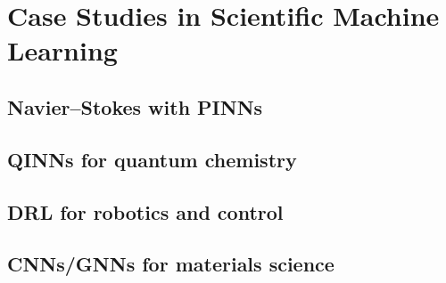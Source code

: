 ﻿\chapter{Case Studies in Scientific Machine Learning}
\section{Navier–Stokes with PINNs}

\section{QINNs for quantum chemistry}

\section{DRL for robotics and control}

\section{CNNs/GNNs for materials science}


